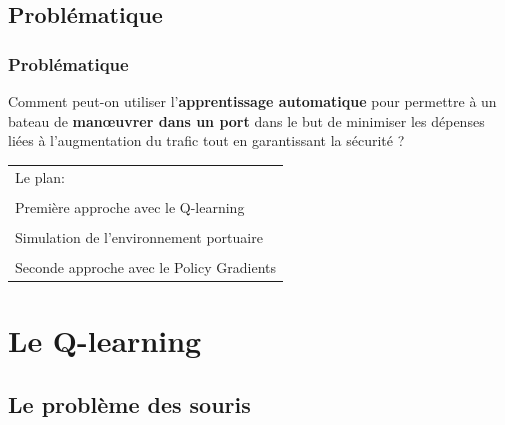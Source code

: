 \documentclass[8pt]{beamer}
\newcommand{\tabitem}{%
  \usebeamertemplate{itemize item}\hspace*{\labelsep}}
\begin{document}
\subsection{Problématique}

\begin{frame}

  \frametitle{Problématique}
  
  Comment peut-on utiliser l’\textbf{apprentissage automatique} pour
  permettre à un bateau de \textbf{manœuvrer dans un port} dans le but de
  minimiser les dépenses liées à l’augmentation du trafic tout en
  garantissant la sécurité ?
  \break \pause
  \begin{center}
    \begin{tabular}{@{}l@{}}
      Le plan: \\ \\ 
      \pause
      \tabitem Première approche avec le Q-learning \\ \\
      \pause
      \tabitem Simulation de l'environnement portuaire \\ \\
      \pause
      \tabitem Seconde approche avec le Policy Gradients
    \end{tabular}
    \end{center}
\end{frame}



\section{Le Q-learning}
\subsection{Le problème des souris}
\end{document}
